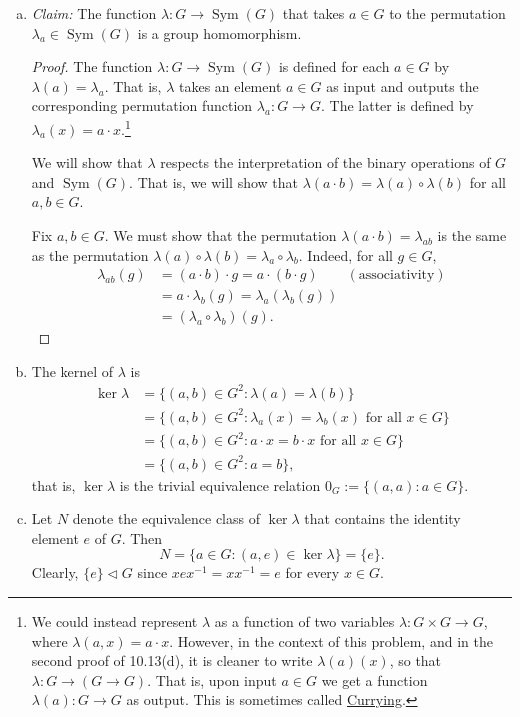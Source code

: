 \documentclass[12pt,reqno]{amsart}
\newcommand{\<}{\ensuremath{\langle}}
\renewcommand{\>}{\ensuremath{\rangle}}
\newcommand{\Sym}{\ensuremath{\operatorname{Sym}}}
\begin{document}

\begin{enumerate}[(a)]
\item 
\emph{Claim:} The function $\lambda: G \rightarrow \Sym(G)$ that takes $a\in G$
to the permutation $\lambda_a\in \Sym(G)$ is a group homomorphism.  
\begin{proof}
The function $\lambda: G \rightarrow \Sym(G)$ is defined for each $a\in G$ by
$\lambda(a) = \lambda_a$.  That is, $\lambda$ takes an element $a\in G$ as input
and outputs the corresponding permutation function $\lambda_a: G \rightarrow G$. 
The latter is defined by $\lambda_a(x) = a\cdot x$.\footnote{We could instead
  represent $\lambda$ as a function of two variables
  $\lambda: G \times G \rightarrow G$, where $\lambda(a,x) = a\cdot x$.
  However, in the context of this problem, and in the second proof of 10.13(d),
  it is cleaner to write $\lambda(a)(x)$, so that  
  $\lambda : G \rightarrow (G \rightarrow G)$. That is, upon input
  $a\in G$ we get a function $\lambda(a): G\rightarrow G$ as output.
  This is sometimes called \href{http://en.wikipedia.org/wiki/Currying}{Currying}. }

We will show that $\lambda$ respects the interpretation of the binary operations
of $G$ and $\Sym(G)$.  That is, we will show that $\lambda(a\cdot b) =
\lambda(a) \circ \lambda(b)$ for all $a, b \in G$.  

Fix $a, b \in G$.  We must show that
the permutation 
$\lambda(a\cdot b) = \lambda_{ab}$
is the same as the permutation 
$\lambda(a) \circ \lambda(b) = \lambda_a \circ \lambda_b$.
Indeed, for all $g \in G$,
\begin{align*}
\lambda_{ab} (g) &= (a\cdot b) \cdot g = a \cdot (b \cdot g) \qquad (\text{associativity})\\
&= a \cdot \lambda_b(g) = \lambda_a (\lambda_b(g)) \\
& = (\lambda_a \circ \lambda_b)(g).
\end{align*}

\end{proof}

\medskip

\item The kernel of $\lambda$ is
  \begin{align*}
\ker \lambda &= \{(a,b) \in G^2 : \lambda(a) = \lambda(b)\}\\
 &= \{(a,b) \in G^2: \lambda_a(x) = \lambda_b(x) \text{ for all $x \in G$}\}\\
 &= \{(a,b) \in G^2: a\cdot x = b\cdot x \text{ for all $x \in G$}\}\\
 &= \{(a,b) \in G^2: a= b\},
  \end{align*}
that is, $\ker \lambda$ is the trivial equivalence relation $0_G := \{(a,a): a\in G\}$.

\bigskip

\item Let $N$ denote the equivalence class of $\ker\lambda$ that contains the
  identity element $e$ of $G$.  Then 
\[
N = \{a \in G : (a, e) \in \ker \lambda\} = \{e\}.
\]
Clearly, $\{e\} \triangleleft G$ since $xex^{-1} = xx^{-1} = e$ for every $x\in G$.
\end{enumerate}
\end{document}
